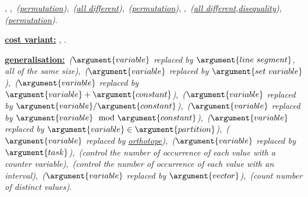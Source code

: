 \begin{ctrdesc}
\hyperlink{Ccircuit_cluster}{},
\hyperlink{Ccycle}{},
\hyperlink{Cderangement}{}\,\emph{(\hyperlink{permutation}{permutation})},
\hyperlink{Cgolomb}{}\,\emph{(\hyperlink{all_different}{all different})},
\hyperlink{Cproper_circuit}{}\,\emph{(\hyperlink{permutation}{permutation})},
\hyperlink{Csize_max_seq_alldifferent}{},
\hyperlink{Csize_max_starting_seq_alldifferent}{}\,\emph{(\hyperlink{all_different}{all different},\hyperlink{disequality}{disequality})},
\hyperlink{Csymmetric_alldifferent}{}\,\emph{(\hyperlink{permutation}{permutation})}.

\hyperlink{Lcost_variant}{{\bf cost variant:}}
\hyperlink{Cminimum_weight_alldifferent}{},
\hyperlink{Cweighted_partial_alldiff}{}.

\hyperlink{Lgeneralisation}{{\bf generalisation:}}
\hyperlink{Call_min_dist}{}\,\emph{($\argument{variable}$ replaced by $\argument{line~segment}$, all of the same size)},
\hyperlink{Calldifferent_between_sets}{}\,\emph{($\argument{variable}$ replaced by $\argument{set~variable}$)},
\hyperlink{Calldifferent_cst}{}\,\emph{($\argument{variable}$ replaced by $\argument{variable}+\argument{constant}$)},
\hyperlink{Calldifferent_interval}{}\,\emph{($\argument{variable}$ replaced by $\argument{variable}/\argument{constant}$)},
\hyperlink{Calldifferent_modulo}{}\,\emph{($\argument{variable}$ replaced by $\argument{variable}\mod \argument{constant}$)},
\hyperlink{Calldifferent_partition}{}\,\emph{($\argument{variable}$ replaced by $\argument{variable}\in \argument{partition}$)},
\hyperlink{Cdiffn}{}\,\emph{($\argument{variable}$ replaced by \hyperlink{orthotope}{orthotope})},
\hyperlink{Cdisjunctive}{}\,\emph{($\argument{variable}$ replaced by $\argument{task}$)},
\hyperlink{Cglobal_cardinality}{}\,\emph{(control the number of occurrence of each value with a counter variable)},
\hyperlink{Cglobal_cardinality_low_up}{}\,\emph{(control the number of occurrence of each value with an interval)},
\hyperlink{Clex_alldifferent}{}\,\emph{($\argument{variable}$ replaced by $\argument{vector}$)},
\hyperlink{Cnvalue}{}\,\emph{(count number of distinct values)}.


\end{ctrdesc}
